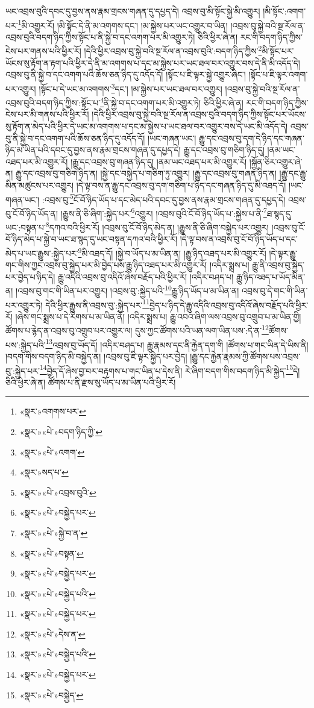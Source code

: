 ཡང་འབྲས་བུའི་དབང་དུ་བྱས་ནས་རྣམ་གྲངས་གཞན་དུ་དཔྱད་དེ། འབྲས་བུ་མི་སྟོང་སྐྱེ་མི་འགྱུར། །མི་སྟོང་:འགག་པར་\footnote{«སྣར་»འགགས་པར་}མི་འགྱུར་རོ། །མི་སྟོང་དེ་ནི་མ་འགགས་དང་། །མ་སྐྱེས་པར་ཡང་འགྱུར་བ་ཡིན། །འབྲས་བུ་སྐྱེ་བའི་སྔ་རོལ་ན་འབྲས་བུའི་བདག་ཉིད་ཀྱིས་སྟོང་པ་ནི་སྐྱེ་བ་དང་འགག་པར་མི་འགྱུར་ཏེ། ཅིའི་ཕྱིར་ཞེ་ན། རང་གི་བདག་ཉིད་ཀྱིས་ངེས་པར་གནས་པའི་ཕྱིར་རོ། །དེའི་ཕྱིར་འབྲས་བུ་སྐྱེ་བའི་སྔ་རོལ་ན་འབྲས་བུའི་:བདག་ཉིད་ཀྱིས་\footnote{«སྣར་»«པེ་»བདག་ཉིད་ཀྱི་}མི་སྟོང་པར་ཡོངས་སུ་རྟོག་ན་རྟག་པའི་ཕྱིར་དེ་ནི་མ་འགགས་པ་དང་མ་སྐྱེས་པར་ཡང་ཐལ་བར་འགྱུར་བས་དེ་ནི་མི་འདོད་དེ། འབྲས་བུ་ནི་སྐྱེ་བ་དང་འགག་པའི་ཆོས་ཅན་ཉིད་དུ་འདོད་དོ། །སྟོང་པ་ཇི་ལྟར་སྐྱེ་འགྱུར་ཞིང་། །སྟོང་པ་ཇི་ལྟར་འགག་པར་འགྱུར། །སྟོང་པ་དེ་ཡང་མ་འགགས་\footnote{«སྣར་»«པེ་»འགག་}དང་། །མ་སྐྱེས་པར་ཡང་ཐལ་བར་འགྱུར། །འབྲས་བུ་སྐྱེ་བའི་སྔ་རོལ་ན་འབྲས་བུའི་བདག་ཉིད་ཀྱིས་:སྟོང་པ་\footnote{«སྣར་»སད་པ་}ནི་སྐྱེ་བ་དང་འགག་པར་མི་འགྱུར་ཏེ། ཅིའི་ཕྱིར་ཞེ་ན། རང་གི་བདག་ཉིད་ཀྱིས་ངེས་པར་མི་གནས་པའི་ཕྱིར་རོ། །དེའི་ཕྱིར་འབྲས་བུ་སྐྱེ་བའི་སྔ་རོལ་ན་འབྲས་བུའི་བདག་ཉིད་ཀྱིས་སྟོང་པར་ཡོངས་སུ་རྟོག་ན་མེད་པའི་ཕྱིར་དེ་ཡང་མ་འགགས་པ་དང་མ་སྐྱེས་པ་ཡང་ཐལ་བར་འགྱུར་བས་དེ་ཡང་མི་འདོད་དེ། འབྲས་བུ་ནི་སྐྱེ་བ་དང་འགག་པའི་ཆོས་ཅན་ཉིད་དུ་འདོད་དོ། །ཡང་གཞན་ཡང་། རྒྱུ་དང་འབྲས་བུ་དག་དེ་ཉིད་དང་གཞན་ཉིད་མ་ཡིན་པའི་དབང་དུ་བྱས་ནས་རྣམ་གྲངས་གཞན་དུ་དཔྱད་དེ། རྒྱུ་དང་འབྲས་བུ་གཅིག་ཉིད་དུ། །ནམ་ཡང་འཐད་པར་མི་འགྱུར་རོ། །རྒྱུ་དང་འབྲས་བུ་གཞན་ཉིད་དུ། །ནམ་ཡང་འཐད་པར་མི་འགྱུར་རོ། །སྐྱོན་ཅིར་འགྱུར་ཞེ་ན། རྒྱུ་དང་འབྲས་བུ་གཅིག་ཉིད་ན། །སྐྱེ་དང་བསྐྱེད་པ་གཅིག་ཏུ་འགྱུར། །རྒྱུ་དང་འབྲས་བུ་གཞན་ཉིད་ན། །རྒྱུ་དང་རྒྱུ་མིན་མཚུངས་པར་འགྱུར། །དེ་ལྟ་བས་ན་རྒྱུ་དང་འབྲས་བུ་དག་གཅིག་པ་ཉིད་དང་གཞན་ཉིད་དུ་མི་འཐད་དོ། །ཡང་གཞན་ཡང་། :འབྲས་བུ་\footnote{«སྣར་»«པེ་»འབྲས་བུའི་}ངོ་བོ་ཉིད་ཡོད་པ་དང་མེད་པའི་དབང་དུ་བྱས་ནས་རྣམ་གྲངས་གཞན་དུ་དཔྱད་དེ། འབྲས་བུ་ངོ་བོ་ཉིད་ཡོད་ན། །རྒྱུས་ནི་ཅི་ཞིག་:སྐྱེད་པར་\footnote{«སྣར་»«པེ་»བསྐྱེད་པར་}འགྱུར། །འབྲས་བུའི་ངོ་བོ་ཉིད་ཡོད་པ་:སྐྱེས་པ་ནི་\footnote{«སྣར་»«པེ་»སྐྱེ་བ་ན་}ཐ་སྙད་དུ་ཡང་:བསྟན་པ་\footnote{«སྣར་»«པེ་»བསྟན་}དཀའ་བའི་ཕྱིར་རོ། །འབྲས་བུ་ངོ་བོ་ཉིད་མེད་ན། །རྒྱུས་ནི་ཅི་ཞིག་བསྐྱེད་པར་འགྱུར། །འབྲས་བུ་ངོ་བོ་ཉིད་མེད་པ་སྐྱེ་བ་ཡང་ཐ་སྙད་དུ་ཡང་བསྟན་དཀའ་བའི་ཕྱིར་རོ། །དེ་ལྟ་བས་ན་འབྲས་བུ་ངོ་བོ་ཉིད་ཡོད་པ་དང་མེད་པ་ཡང་རྒྱུས་:སྐྱེད་པར་\footnote{«སྣར་»«པེ་»བསྐྱེད་པར་}མི་འཐད་དོ། །སྐྱེ་བ་ཡོད་པ་མ་ཡིན་ན། །རྒྱུ་ཉིད་འཐད་པར་མི་འགྱུར་རོ། །དེ་ལྟར་རྒྱུ་གང་གིས་ཀྱང་འབྲས་བུ་སྐྱེད་པར་མི་བྱེད་པས་རྒྱུ་ཉིད་འཐད་པར་མི་འགྱུར་རོ། །འདིར་སྨྲས་པ། རྒྱུ་ནི་འབྲས་བུ་སྐྱེད་པར་བྱེད་པ་ཉིད་དེ། རྒྱུ་འདིའི་འབྲས་བུ་འདིའོ་ཞེས་བརྗོད་པའི་ཕྱིར་རོ། །འདིར་བཤད་པ། རྒྱུ་ཉིད་འཐད་པ་ཡོད་མིན་ན། །འབྲས་བུ་གང་གི་ཡིན་པར་འགྱུར། །འབྲས་བུ་:སྐྱེད་པའི་\footnote{«སྣར་»«པེ་»བསྐྱེད་པའི་}རྒྱུ་ཉིད་ཡོད་པ་མ་ཡིན་ན། འབྲས་བུ་དེ་གང་གི་ཡིན་པར་འགྱུར་ཏེ། དེའི་ཕྱིར་རྒྱུས་ནི་འབྲས་བུ་:སྐྱེད་པར་\footnote{«སྣར་»«པེ་»བསྐྱེད་པར་}བྱེད་པ་ཉིད་དེ་རྒྱུ་འདིའི་འབྲས་བུ་འདིའོ་ཞེས་བརྗོད་པའི་ཕྱིར་རོ། །ཞེས་གང་སྨྲས་པ་དེ་རིགས་པ་མ་ཡིན་ནོ། །འདིར་སྨྲས་པ། རྒྱུ་འབའ་ཞིག་ལས་འབྲས་བུ་འགྲུབ་པ་མ་ཡིན་གྱི། ཚོགས་པ་རྙེད་ན་འབྲས་བུ་འགྲུབ་པར་འགྱུར་ལ། དུས་ཀྱང་ཚོགས་པའི་ཡན་ལག་ཡིན་པས་:དེ་ན་\footnote{«སྣར་»«པེ་»དེས་ན་}ཚོགས་པས་:སྐྱེད་པའི་\footnote{«སྣར་»«པེ་»བསྐྱེད་པའི་}འབྲས་བུ་ཡོད་དོ། །འདིར་བཤད་པ། རྒྱུ་རྣམས་དང་ནི་རྐྱེན་དག་གི །ཚོགས་པ་གང་ཡིན་དེ་ཡིས་ནི། །བདག་གིས་བདག་ཉིད་མི་བསྐྱེད་ན། །འབྲས་བུ་ཇི་ལྟར་སྐྱེད་པར་བྱེད། །རྒྱུ་དང་རྐྱེན་རྣམས་ཀྱི་ཚོགས་པས་འབྲས་བུ་:སྐྱེད་པར་\footnote{«སྣར་»«པེ་»བསྐྱེད་པར་}བྱེད་དོ་ཞེས་བྱ་བར་བརྟགས་པ་གང་ཡིན་པ་དེས་ནི། རེ་ཞིག་བདག་གིས་བདག་ཉིད་མི་སྐྱེད་\footnote{«སྣར་»«པེ་»བསྐྱེད་}དེ། ཅིའི་ཕྱིར་ཞེ་ན། ཚོགས་པ་ནི་རྫས་སུ་ཡོད་པ་མ་ཡིན་པའི་ཕྱིར་རོ། 